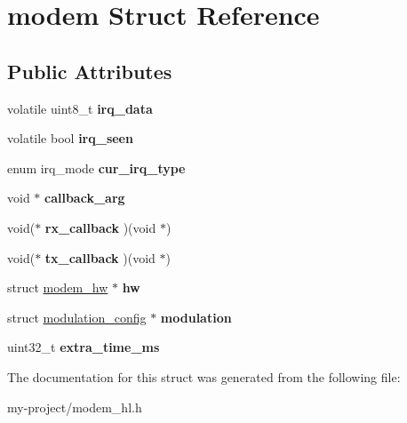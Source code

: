\hypertarget{structmodem}{}\section{modem Struct Reference}
\label{structmodem}
\subsection*{Public Attributes}
\begin{DoxyCompactItemize}
\item 
\mbox{\label{structmodem_aa0328ee21b5e435ca2977b5c686fed95}} 
volatile uint8\+\_\+t {\bfseries irq\+\_\+data}
\item 
\mbox{\label{structmodem_af5d8a66f5b6c8299417a9aa27d8a16a6}} 
volatile bool {\bfseries irq\+\_\+seen}
\item 
\mbox{\label{structmodem_aff0ded0d391da25ba5ae06168613e8e2}} 
enum irq\+\_\+mode {\bfseries cur\+\_\+irq\+\_\+type}
\item 
\mbox{\label{structmodem_a65abd352b4e9369984b789f37f78ddd8}} 
void $\ast$ {\bfseries callback\+\_\+arg}
\item 
\mbox{\label{structmodem_aee47ba7d5e6b26836e3b40877ceebc70}} 
void($\ast$ {\bfseries rx\+\_\+callback} )(void $\ast$)
\item 
\mbox{\label{structmodem_a07c56de0d2b40059ecad990b9ace3aba}} 
void($\ast$ {\bfseries tx\+\_\+callback} )(void $\ast$)
\item 
\mbox{\label{structmodem_aa3c82c2039e2e8b4829a3de28951f055}} 
struct \mbox{\hyperlink{structmodem__hw}{modem\+\_\+hw}} $\ast$ {\bfseries hw}
\item 
\mbox{\label{structmodem_a2c6959d28fdb0622d026115e8630e196}} 
struct \mbox{\hyperlink{structmodulation__config}{modulation\+\_\+config}} $\ast$ {\bfseries modulation}
\item 
\mbox{\label{structmodem_a5b5b88e08290cd94e10ff19cb0e77b2f}} 
uint32\+\_\+t {\bfseries extra\+\_\+time\+\_\+ms}
\end{DoxyCompactItemize}


The documentation for this struct was generated from the following file\+:\begin{DoxyCompactItemize}
\item 
my-\/project/modem\+\_\+hl.\+h\end{DoxyCompactItemize}
